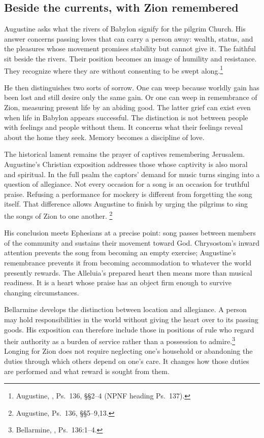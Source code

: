 \subsection{Beside the currents, with Zion remembered}
Augustine asks what the rivers of Babylon signify for the pilgrim Church.
His answer concerns passing loves that can carry a person away: wealth,
status, and the pleasures whose movement promises stability but cannot
give it. The faithful sit beside the rivers. Their position becomes an
image of humility and resistance. They recognize where they are without
consenting to be swept along.\footnote{Augustine, , Ps.~136, \S\S2--4 (NPNF heading Ps.~137).}

He then distinguishes two sorts of sorrow. One can weep because worldly
gain has been lost and still desire only the same gain. Or one can weep
in remembrance of Zion, measuring present life by an abiding good.
The latter grief can exist even when life in Babylon appears successful.
The distinction is not between people with feelings and people without
them. It concerns what their feelings reveal about the home they seek.
Memory becomes a discipline of love.

The historical lament remains the prayer of captives remembering
Jerusalem. Augustine's Christian exposition addresses those whose
captivity is also moral and spiritual. In the full psalm the captors'
demand for music turns singing into a question of allegiance. Not every
occasion for a song is an occasion for truthful praise. Refusing a
performance for mockery is different from forgetting the song itself.
That difference allows Augustine to finish by urging the pilgrims to
sing the songs of Zion to one another.
\footnote{Augustine, Ps.~136, \S\S5--9,13.}

His conclusion meets Ephesians at a precise point: song passes between
members of the community and sustains their movement toward God.
Chrysostom's inward attention prevents the song from becoming an empty
exercise; Augustine's remembrance prevents it from becoming accommodation
to whatever the world presently rewards. The Alleluia's prepared heart
then means more than musical readiness. It is a heart whose praise has
an object firm enough to survive changing circumstances.

Bellarmine develops the distinction between location and allegiance.
A person may hold responsibilities in the world without giving the
heart over to its passing goods. His exposition can therefore include
those in positions of rule who regard their authority as a burden of
service rather than a possession to admire.\footnote{Bellarmine,
, Ps.~136:1--4.}
Longing for Zion does not require neglecting one's household or abandoning
the duties through which others depend on one's care. It changes how
those duties are performed and what reward is sought from them.

